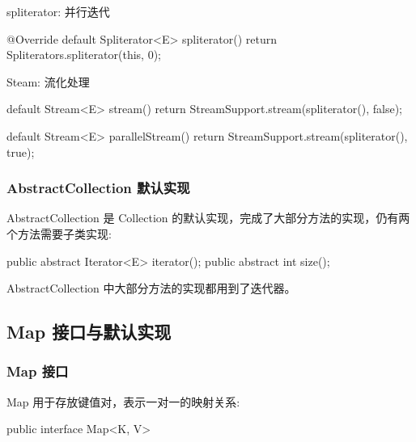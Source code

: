 spliterator: 并行迭代

\begin{Java}
@Override
default Spliterator<E> spliterator() {
    return Spliterators.spliterator(this, 0);
}
\end{Java}

Steam: 流化处理

\begin{Java}
default Stream<E> stream() {
    return StreamSupport.stream(spliterator(), false);
}

default Stream<E> parallelStream() {
    return StreamSupport.stream(spliterator(), true);
}
\end{Java}

\subsubsection{AbstractCollection 默认实现}

AbstractCollection 是 Collection 的默认实现，完成了大部分方法的实现，仍有两个方法需要子类实现:

\begin{Java}
public abstract Iterator<E> iterator();
public abstract int size();
\end{Java}

AbstractCollection 中大部分方法的实现都用到了迭代器。

\subsection{Map 接口与默认实现}

\subsubsection{Map 接口}

Map 用于存放键值对，表示一对一的映射关系:

\begin{Java}
public interface Map<K, V>
\end{Java}

